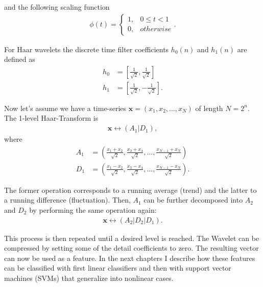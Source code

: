 and the following scaling function
\begin{align}
\phi(t) = 
\begin{cases}
1, & 0 \le t < 1 \\
0, & otherwise
\end{cases}.
\end{align}

For Haar wavelets the discrete time filter coefficients $h_0(n)$ and $h_1(n)$ are defined as
\begin{align}
h_0 &= \left [ \frac{1}{\sqrt{2}}, \frac{1}{\sqrt{2}} \right ] \\
h_1 &= \left [ \frac{1}{\sqrt{2}}, -\frac{1}{\sqrt{2}} \right ].
\end{align}

Now let's assume we have a time-series $\mathbf{x} = (x_1, x_2, ..., x_N)$ of length $N = 2^n$. The 1-level Haar-Transform is
\begin{align}
\mathbf{x} \longleftrightarrow (A_1 | D_1),
\end{align}
where 
\begin{align}
A_1 &= \left ( \frac{x_1 + x_2}{\sqrt{2}}, \frac{x_3 + x_4}{\sqrt{2}}, ..., \frac{x_{N-1} + x_N}{\sqrt{2}} \right ) \\
D_1 &= \left ( \frac{x_1 - x_2}{\sqrt{2}}, \frac{x_3 - x_4}{\sqrt{2}}, ..., \frac{x_{N-1} - x_N}{\sqrt{2}} \right ).
\end{align}

The former operation corresponds to a running average (trend) and the latter to a running difference (fluctuation). Then, $A_1$ can be further decomposed into $A_2$ and $D_2$ by performing the same operation again:
\begin{align}
\mathbf{x} \longleftrightarrow (A_2 | D_2 | D_1).
\end{align}

This process is then repeated until a desired level is reached. The Wavelet can be compressed by setting some of the detail coefficients to zero. The resulting vector can now be used as a feature. In the next chapters I describe how these features can be classified with first linear classifiers and then with support vector machines (SVMs) that generalize into nonlinear cases.
